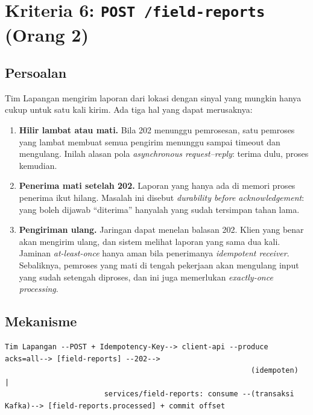 \section{Kriteria 6: \texttt{POST /\allowbreak{}field-\allowbreak{}reports} (Orang 2)}

\subsection{Persoalan}

Tim Lapangan mengirim laporan dari lokasi dengan sinyal yang mungkin hanya cukup untuk satu kali kirim. Ada tiga hal yang dapat merusaknya:


\begin{enumerate}
\item \textbf{Hilir lambat atau mati.} Bila 202 menunggu pemrosesan, satu pemroses yang lambat membuat semua pengirim menunggu sampai timeout dan mengulang. Inilah alasan pola \emph{asynchronous request--reply}: terima dulu, proses kemudian.
\item \textbf{Penerima mati setelah 202.} Laporan yang hanya ada di memori proses penerima ikut hilang. Masalah ini disebut \emph{durability before acknowledgement}: yang boleh dijawab ``diterima'' hanyalah yang sudah tersimpan tahan lama.
\item \textbf{Pengiriman ulang.} Jaringan dapat menelan balasan 202. Klien yang benar akan mengirim ulang, dan sistem melihat laporan yang sama dua kali. Jaminan \emph{at-least-once} hanya aman bila penerimanya \emph{idempotent receiver}. Sebaliknya, pemroses yang mati di tengah pekerjaan akan mengulang input yang sudah setengah diproses, dan ini juga memerlukan \emph{exactly-once processing}.
\end{enumerate}

\subsection{Mekanisme}

\begin{lstlisting}
Tim Lapangan --POST + Idempotency-Key--> client-api --produce acks=all--> [field-reports] --202-->
                                                         (idempoten)          |
                       services/field-reports: consume --(transaksi Kafka)--> [field-reports.processed] + commit offset
\end{lstlisting}

